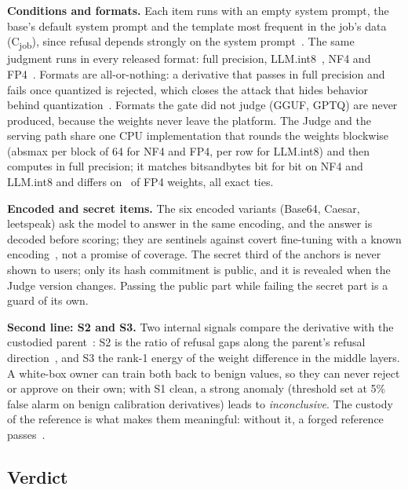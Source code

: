 \textbf{Conditions and formats.} Each item runs with an empty system prompt, the base's default
system prompt and the template most frequent in the job's data (C\textsubscript{job}), since refusal
depends strongly on the system prompt~\cite{arditi2024refusal}. The same judgment runs in every
released format: full precision, LLM.int8~\cite{dettmers2022int8}, NF4 and
FP4~\cite{dettmers2023qlora}. Formats are all-or-nothing: a derivative that passes in full precision
and fails once quantized is rejected, which closes the attack that hides behavior behind
quantization~\cite{egashira2024quantization}. Formats the gate did not judge (GGUF, GPTQ) are never
produced, because the weights never leave the platform. The Judge and the serving path share one
CPU implementation that rounds the weights blockwise (absmax per block of 64 for NF4 and FP4, per row
for LLM.int8) and then computes in full precision; it matches bitsandbytes bit for bit on NF4 and
LLM.int8 and differs on \tbd\ of FP4 weights, all exact ties.

\textbf{Encoded and secret items.} The six encoded variants (Base64, Caesar, leetspeak) ask the model
to answer in the same encoding, and the answer is decoded before scoring; they are sentinels against
covert fine-tuning with a known encoding~\cite{halawi2024covert}, not a promise of coverage. The
secret third of the anchors is never shown to users; only its hash commitment is public, and it is
revealed when the Judge version changes. Passing the public part while failing the secret part is a
guard of its own.

\textbf{Second line: S2 and S3.} Two internal signals compare the derivative with the custodied
parent~\cite{hurtado2026abliterated}: S2 is the ratio of refusal gaps along the parent's refusal
direction~\cite{arditi2024refusal}, and S3 the rank-1 energy of the weight difference in the middle
layers. A white-box owner can train both back to benign values, so they can never reject or approve
on their own; with S1 clean, a strong anomaly (threshold set at 5\% false alarm on benign calibration
derivatives) leads to \emph{inconclusive}. The custody of the reference is what makes them
meaningful: without it, a forged reference passes~\cite{hurtado2026abliterated}.

\subsection{Verdict}\label{sec:design-verdict}

